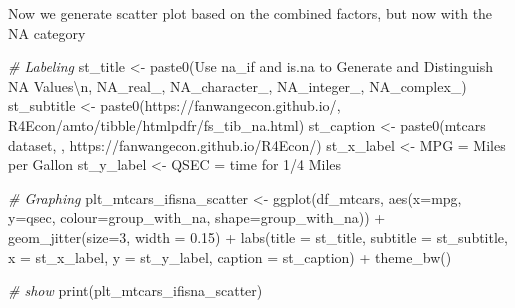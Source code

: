 \documentclass[
]{book}
\newenvironment{Shaded}{\begin{snugshade}}{\end{snugshade}}
\newcommand{\AttributeTok}[1]{\textcolor[rgb]{0.77,0.63,0.00}{#1}}
\newcommand{\CommentTok}[1]{\textcolor[rgb]{0.56,0.35,0.01}{\textit{#1}}}
\newcommand{\DecValTok}[1]{\textcolor[rgb]{0.00,0.00,0.81}{#1}}
\newcommand{\FloatTok}[1]{\textcolor[rgb]{0.00,0.00,0.81}{#1}}
\newcommand{\FunctionTok}[1]{\textcolor[rgb]{0.00,0.00,0.00}{#1}}
\newcommand{\NormalTok}[1]{#1}
\newcommand{\OtherTok}[1]{\textcolor[rgb]{0.56,0.35,0.01}{#1}}
\newcommand{\SpecialCharTok}[1]{\textcolor[rgb]{0.00,0.00,0.00}{#1}}
\newcommand{\StringTok}[1]{\textcolor[rgb]{0.31,0.60,0.02}{#1}}
\begin{document}
Now we generate scatter plot based on the combined factors, but now with the NA category

\begin{Shaded}
\begin{Highlighting}[]
\CommentTok{\# Labeling}
\NormalTok{st\_title }\OtherTok{\textless{}{-}} \FunctionTok{paste0}\NormalTok{(}\StringTok{\textquotesingle{}Use na\_if and is.na to Generate and Distinguish NA Values}\SpecialCharTok{\textbackslash{}n}\StringTok{\textquotesingle{}}\NormalTok{,}
                   \StringTok{\textquotesingle{}NA\_real\_, NA\_character\_, NA\_integer\_, NA\_complex\_\textquotesingle{}}\NormalTok{)}
\NormalTok{st\_subtitle }\OtherTok{\textless{}{-}} \FunctionTok{paste0}\NormalTok{(}\StringTok{\textquotesingle{}https://fanwangecon.github.io/\textquotesingle{}}\NormalTok{,}
                      \StringTok{\textquotesingle{}R4Econ/amto/tibble/htmlpdfr/fs\_tib\_na.html\textquotesingle{}}\NormalTok{)}
\NormalTok{st\_caption }\OtherTok{\textless{}{-}} \FunctionTok{paste0}\NormalTok{(}\StringTok{\textquotesingle{}mtcars dataset, \textquotesingle{}}\NormalTok{,}
                     \StringTok{\textquotesingle{}https://fanwangecon.github.io/R4Econ/\textquotesingle{}}\NormalTok{)}
\NormalTok{st\_x\_label }\OtherTok{\textless{}{-}} \StringTok{\textquotesingle{}MPG = Miles per Gallon\textquotesingle{}}
\NormalTok{st\_y\_label }\OtherTok{\textless{}{-}} \StringTok{\textquotesingle{}QSEC = time for 1/4 Miles\textquotesingle{}}

\CommentTok{\# Graphing}
\NormalTok{plt\_mtcars\_ifisna\_scatter }\OtherTok{\textless{}{-}} 
  \FunctionTok{ggplot}\NormalTok{(df\_mtcars, }
         \FunctionTok{aes}\NormalTok{(}\AttributeTok{x=}\NormalTok{mpg, }\AttributeTok{y=}\NormalTok{qsec, }
             \AttributeTok{colour=}\NormalTok{group\_with\_na, }
             \AttributeTok{shape=}\NormalTok{group\_with\_na)) }\SpecialCharTok{+}
  \FunctionTok{geom\_jitter}\NormalTok{(}\AttributeTok{size=}\DecValTok{3}\NormalTok{, }\AttributeTok{width =} \FloatTok{0.15}\NormalTok{) }\SpecialCharTok{+}
  \FunctionTok{labs}\NormalTok{(}\AttributeTok{title =}\NormalTok{ st\_title, }\AttributeTok{subtitle =}\NormalTok{ st\_subtitle,}
       \AttributeTok{x =}\NormalTok{ st\_x\_label, }\AttributeTok{y =}\NormalTok{ st\_y\_label, }\AttributeTok{caption =}\NormalTok{ st\_caption) }\SpecialCharTok{+}
  \FunctionTok{theme\_bw}\NormalTok{()}

\CommentTok{\# show}
\FunctionTok{print}\NormalTok{(plt\_mtcars\_ifisna\_scatter)}
\end{Highlighting}
\end{Shaded}
\end{document}
